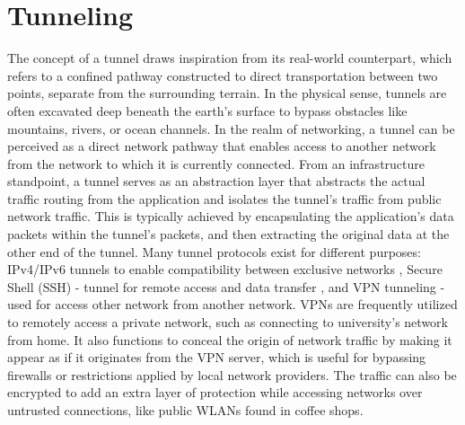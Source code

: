 \section{Tunneling}
The concept of a tunnel draws inspiration from its real-world counterpart, which refers to a confined pathway constructed to direct transportation between two points, separate from the surrounding terrain. 
In the physical sense, tunnels are often excavated deep beneath the earth's surface to bypass obstacles like mountains, rivers, or ocean channels.
In the realm of networking, a tunnel can be perceived as a direct network pathway that enables access to another network from the network to which it is currently connected. 
From an infrastructure standpoint, a tunnel serves as an abstraction layer that abstracts the actual traffic routing from the application and isolates the tunnel's traffic from public network traffic. 
This is typically achieved by encapsulating the application's data packets within the tunnel's packets, and then extracting the original data at the other end of the tunnel.
Many tunnel protocols exist for different purposes: IPv4/IPv6 tunnels to enable compatibility between exclusive networks \cite{rfc4380_Teredo_ipv6_tunnel_udp}, Secure Shell (SSH) - tunnel for remote access and data transfer \cite{rfc4251_ssh_protocol}, and \ac{VPN} tunneling - used for access other network from another network. 
\ac{VPN}s are frequently utilized to remotely access a private network, such as connecting to university's network from home. 
It also functions to conceal the origin of network traffic by making it appear as if it originates from the VPN server, which is useful for bypassing firewalls or restrictions applied by local network providers.
The traffic can also be encrypted to add an extra layer of protection while accessing networks over untrusted connections, like public WLANs found in coffee shops.

